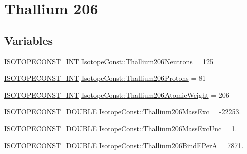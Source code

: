 \hypertarget{group___isotope_const-_thallium-_tl206}{}\section{Thallium 206}
\label{group___isotope_const-_thallium-_tl206}
\subsection*{Variables}
\begin{DoxyCompactItemize}
\item 
\mbox{\hyperlink{group___isotope_const-_macros_ga5f18360b3e99483a35c32d789e62621c}{I\+S\+O\+T\+O\+P\+E\+C\+O\+N\+S\+T\+\_\+\+I\+NT}} \mbox{\hyperlink{group___isotope_const-_thallium-_tl206_ga65ec322432a836fafb2561c0b87301b1}{Isotope\+Const\+::\+Thallium206\+Neutrons}} = 125
\item 
\mbox{\hyperlink{group___isotope_const-_macros_ga5f18360b3e99483a35c32d789e62621c}{I\+S\+O\+T\+O\+P\+E\+C\+O\+N\+S\+T\+\_\+\+I\+NT}} \mbox{\hyperlink{group___isotope_const-_thallium-_tl206_ga5635562e6ae514824515f1a0e88ad8e4}{Isotope\+Const\+::\+Thallium206\+Protons}} = 81
\item 
\mbox{\hyperlink{group___isotope_const-_macros_ga5f18360b3e99483a35c32d789e62621c}{I\+S\+O\+T\+O\+P\+E\+C\+O\+N\+S\+T\+\_\+\+I\+NT}} \mbox{\hyperlink{group___isotope_const-_thallium-_tl206_gafe027611d2ff15e42b1b74e80df6ed1b}{Isotope\+Const\+::\+Thallium206\+Atomic\+Weight}} = 206
\item 
\mbox{\hyperlink{group___isotope_const-_macros_ga8f45a7272ce02c0b4c65c44636ed719a}{I\+S\+O\+T\+O\+P\+E\+C\+O\+N\+S\+T\+\_\+\+D\+O\+U\+B\+LE}} \mbox{\hyperlink{group___isotope_const-_thallium-_tl206_ga719482337d9fbbb49acedacc32618d91}{Isotope\+Const\+::\+Thallium206\+Mass\+Exc}} = -\/22253.
\item 
\mbox{\hyperlink{group___isotope_const-_macros_ga8f45a7272ce02c0b4c65c44636ed719a}{I\+S\+O\+T\+O\+P\+E\+C\+O\+N\+S\+T\+\_\+\+D\+O\+U\+B\+LE}} \mbox{\hyperlink{group___isotope_const-_thallium-_tl206_ga3f40db04205cc9b123f5fbaac78ca8fc}{Isotope\+Const\+::\+Thallium206\+Mass\+Exc\+Unc}} = 1.
\item 
\mbox{\hyperlink{group___isotope_const-_macros_ga8f45a7272ce02c0b4c65c44636ed719a}{I\+S\+O\+T\+O\+P\+E\+C\+O\+N\+S\+T\+\_\+\+D\+O\+U\+B\+LE}} \mbox{\hyperlink{group___isotope_const-_thallium-_tl206_gab6040aae696af4d78f8d14e6dc3b5984}{Isotope\+Const\+::\+Thallium206\+Bind\+E\+PerA}} = 7871.
\item 

\end{DoxyCompactItemize}
